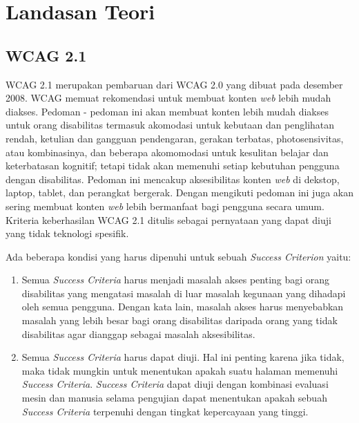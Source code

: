 \chapter{Landasan Teori}
\label{chap:teori}


\section{WCAG 2.1}
\label{sec:WCAG2.1} 
WCAG 2.1 merupakan pembaruan dari WCAG 2.0 yang dibuat pada desember 2008. WCAG memuat rekomendasi untuk membuat konten \textit{web} lebih mudah diakses. Pedoman - pedoman ini akan membuat konten lebih mudah diakses untuk orang disabilitas termasuk akomodasi untuk kebutaan dan penglihatan rendah, ketulian dan gangguan pendengaran, gerakan terbatas, photosensivitas, atau kombinasinya, dan beberapa akomomodasi untuk kesulitan belajar dan keterbatasan kognitif; tetapi tidak akan memenuhi setiap kebutuhan pengguna dengan disabilitas. Pedoman ini mencakup aksesibilitas konten \textit{web} di dekstop, laptop, tablet, dan perangkat bergerak. Dengan mengikuti pedoman ini juga akan sering membuat konten \textit{web} lebih bermanfaat bagi pengguna secara umum. Kriteria keberhasilan WCAG 2.1 ditulis sebagai pernyataan yang dapat diuji yang tidak teknologi spesifik.

Ada beberapa kondisi yang harus dipenuhi untuk sebuah \textit{Success Criterion} yaitu:
\begin{enumerate}
	\item Semua \textit{Success Criteria} harus menjadi masalah akses penting bagi orang disabilitas yang mengatasi masalah di luar masalah kegunaan yang dihadapi oleh semua pengguna. Dengan kata lain, masalah akses harus menyebabkan masalah yang lebih besar bagi orang disabilitas daripada orang yang tidak disabilitas agar dianggap sebagai masalah aksesibilitas.
	\item Semua \textit{Success Criteria} harus dapat diuji. Hal ini penting karena jika tidak, maka tidak mungkin untuk menentukan apakah suatu halaman memenuhi \textit{Success Criteria}. \textit{Success Criteria} dapat diuji dengan kombinasi evaluasi mesin dan manusia selama pengujian dapat menentukan apakah sebuah \textit{Success Criteria} terpenuhi dengan tingkat kepercayaan yang tinggi.
\end{enumerate}

